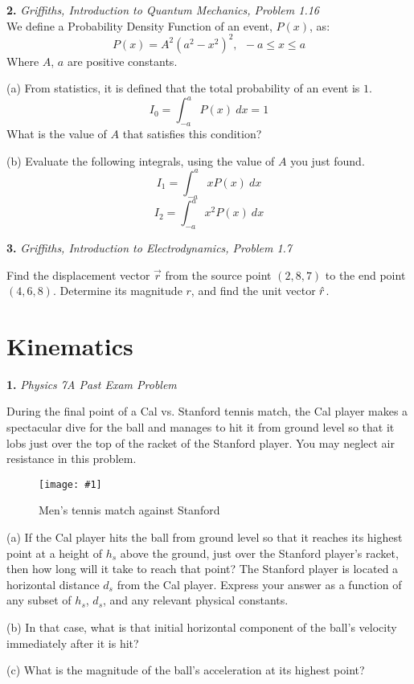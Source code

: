 \documentclass[11pt]{article}
\newcommand{\fig}[4]{
    \begin{figure}[H]
        \centering
        \texttt{[image: \#1]}
        \caption{#2}
        \label{exp4fit}
    \end{figure}
}
\theoremstyle{gangnamstyle}{\newtheorem{definition}{Definition}[]}
\theoremstyle{gangnamstyle}{\newtheorem{example}{Example}[]}
\theoremstyle{gangnamstyle}{\newtheorem{problem}{Problem}[]}
\begin{document}
\textbf{2.} \textit{Griffiths, Introduction to Quantum Mechanics, Problem 1.16} \\
We define a Probability Density Function of an event, $P(x)$, as: 
\[ P(x) = A^2(a^2 - x^2)^2, \ \ -a \leq x \leq a \]
Where $A$, $a$ are positive constants. 

(a) From statistics, it is defined that the total probability of an event is $1$. 
\[ I_0 = \int_{-a}^{a} P(x) \ dx = 1 \]
What is the value of $A$ that satisfies this condition? 

(b) Evaluate the following integrals, using the value of $A$ you just found. 
\[ I_1 = \int_{-a}^{a} x P(x) \ dx \]
\[ I_2 = \int_{-a}^{a} x^2 P(x) \ dx \]

\pagebreak

\textbf{3.} \textit{Griffiths, Introduction to Electrodynamics, Problem 1.7} 

Find the displacement vector $\Vec{r}$ from the source point $(2,8,7)$ to the end point $(4,6,8)$. Determine its magnitude $r$, and find the unit vector $\Hat{r}$.

\pagebreak

\section{Kinematics}

\textbf{1.} \textit{Physics 7A Past Exam Problem}

During the final point of a Cal vs. Stanford tennis match, the Cal player makes a spectacular dive for the ball and manages to hit it from ground level so that it lobs just over the top of the racket of the Stanford player. You may neglect air resistance in this problem.

\fig{figs/mt1/f221.png}{Men’s tennis match against Stanford}{0.6}{0}

(a) If the Cal player hits the ball from ground level so that it reaches its highest point at a height of $h_s$ above the ground, just over the Stanford player’s racket, then how long will it take to reach that point? The Stanford player is located a horizontal distance $d_s$ from the Cal player. Express your answer as a function of any subset of $h_s$, $d_s$, and any relevant physical constants.

(b) In that case, what is that initial horizontal component of the ball’s velocity immediately after it is hit?

(c) What is the magnitude of the ball’s acceleration at its highest point?
\end{document}
